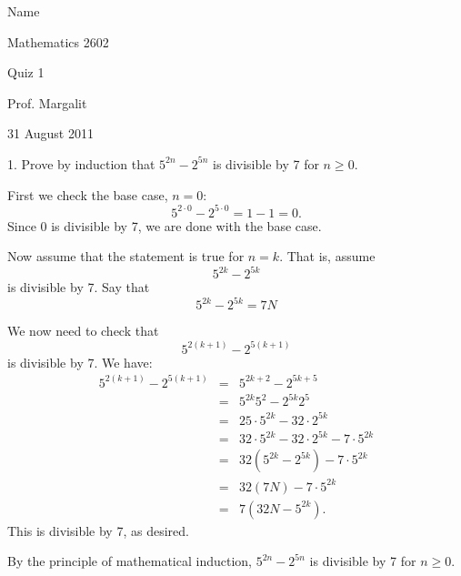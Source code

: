 \documentclass[12pt]{article}
\begin{document}




\hspace{3.8in}
Name \underline{\space \space \space \space\space \space \space \space \space
\space
\space \space \space \space \space \space\space \space \space \space \space \space
\space \space  \space \space \space \space \space \space\space \space \space \space \space
\space}
\bigskip

\begin{center}
{\Large Mathematics 2602}

Quiz 1

Prof. Margalit

31 August 2011

\end{center}

1.  Prove by induction that $5^{2n}-2^{5n}$ is divisible by 7 for $n \geq 0$.

\bigskip

First we check the base case, $n=0$:
\[  5^{2 \cdot 0} - 2^{5 \cdot 0} = 1 - 1 = 0  .\]
Since 0 is divisible by 7, we are done with the base case.

\bigskip

Now assume that the statement is true for $n=k$.  That is, assume
\[ 5^{2k}-2^{5k} \]
is divisible by 7.  Say that 
\[ 5^{2k}-2^{5k} = 7N \]

\bigskip

We now need to check that 
\[ 5^{2(k+1)}-2^{5(k+1)} \]
is divisible by 7.  We have:
\[ \begin{array}{rcl}
5^{2(k+1)}-2^{5(k+1)} &=& 5^{2k+2}-2^{5k+5} \\
&=& 5^{2k}5^2 - 2^{5k}2^5 \\
&=& 25\cdot 5^{2k} - 32 \cdot 2^{5k} \\
&=& 32\cdot 5^{2k} - 32 \cdot 2^{5k} -7 \cdot 5^{2k} \\
&=&32(5^{2k}-2^{5k}) - 7 \cdot 5^{2k} \\
&=&32(7N)-7 \cdot 5^{2k} \\
&=& 7(32N-5^{2k}). 
\end{array}
\]
This is divisible by 7, as desired.

\bigskip

By the principle of mathematical induction, $5^{2n}-2^{5n}$ is divisible by 7 for $n \geq 0$.

\vfill
\end{document}
